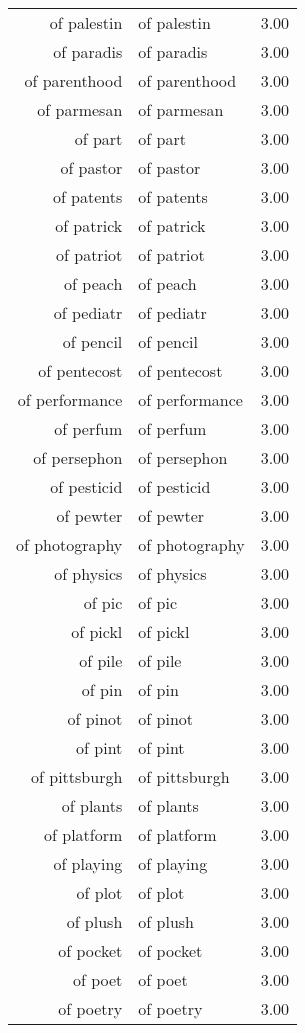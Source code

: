 \begin{table}[ht]
\begin{tabular}{rlr}
  of palestin & of palestin & 3.00 \\ 
  of paradis & of paradis & 3.00 \\ 
  of parenthood & of parenthood & 3.00 \\ 
  of parmesan & of parmesan & 3.00 \\ 
  of part & of part & 3.00 \\ 
  of pastor & of pastor & 3.00 \\ 
  of patents & of patents & 3.00 \\ 
  of patrick & of patrick & 3.00 \\ 
  of patriot & of patriot & 3.00 \\ 
  of peach & of peach & 3.00 \\ 
  of pediatr & of pediatr & 3.00 \\ 
  of pencil & of pencil & 3.00 \\ 
  of pentecost & of pentecost & 3.00 \\ 
  of performance & of performance & 3.00 \\ 
  of perfum & of perfum & 3.00 \\ 
  of persephon & of persephon & 3.00 \\ 
  of pesticid & of pesticid & 3.00 \\ 
  of pewter & of pewter & 3.00 \\ 
  of photography & of photography & 3.00 \\ 
  of physics & of physics & 3.00 \\ 
  of pic & of pic & 3.00 \\ 
  of pickl & of pickl & 3.00 \\ 
  of pile & of pile & 3.00 \\ 
  of pin & of pin & 3.00 \\ 
  of pinot & of pinot & 3.00 \\ 
  of pint & of pint & 3.00 \\ 
  of pittsburgh & of pittsburgh & 3.00 \\ 
  of plants & of plants & 3.00 \\ 
  of platform & of platform & 3.00 \\ 
  of playing & of playing & 3.00 \\ 
  of plot & of plot & 3.00 \\ 
  of plush & of plush & 3.00 \\ 
  of pocket & of pocket & 3.00 \\ 
  of poet & of poet & 3.00 \\ 
  of poetry & of poetry & 3.00 \\ 

\end{tabular}
\end{table}
